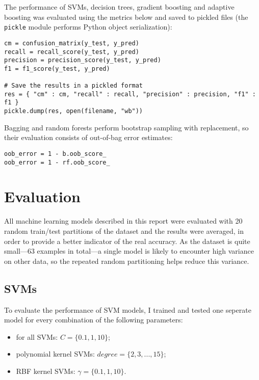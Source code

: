 \documentclass[11pt]{article}
\numberwithin{equation}{section}
\begin{document}
The performance of SVMs, decision trees, gradient boosting and adaptive boosting was evaluated using the metrics below and saved to pickled files (the \texttt{pickle} module performs Python object serialization):
\begin{verbatim}
cm = confusion_matrix(y_test, y_pred)
recall = recall_score(y_test, y_pred)
precision = precision_score(y_test, y_pred)
f1 = f1_score(y_test, y_pred)

# Save the results in a pickled format
res = { "cm" : cm, "recall" : recall, "precision" : precision, "f1" : f1 }
pickle.dump(res, open(filename, "wb"))
\end{verbatim}

Bagging and random forests perform bootstrap sampling with replacement, so their evaluation consists of out-of-bag error estimates:
\begin{verbatim}
oob_error = 1 - b.oob_score_
oob_error = 1 - rf.oob_score_
\end{verbatim}

\section{Evaluation}

All machine learning models described in this report were evaluated with 20 random train/test partitions of the dataset and the results were averaged, in order to provide a better indicator of the real accuracy. As the dataset is quite small---63 examples in total---a single model is likely to encounter high variance on other data, so the repeated random partitioning helps reduce this variance.

\subsection{SVMs}

To evaluate the performance of SVM models, I trained and tested one seperate model for every combination of the following parameters:
\begin{itemize}
\item for all SVMs: $C = \{0.1, 1, 10\}$;
\item polynomial kernel SVMs: $\textit{degree} = \{2, 3, ..., 15\}$;
\item RBF kernel SVMs: $\gamma = \{0.1, 1, 10\}$.
\end{itemize}
\end{document}
